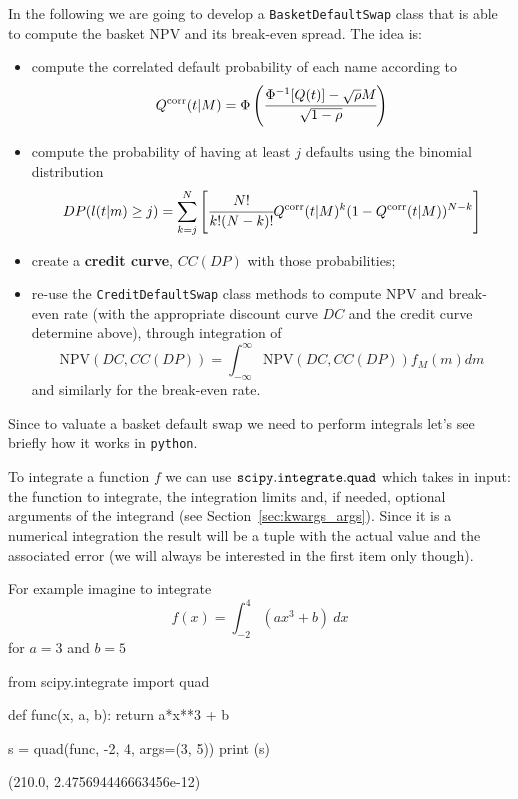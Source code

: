 In the following we are going to develop a \texttt{BasketDefaultSwap} class that is able to compute the basket NPV and its break-even spread. The idea is:
\begin{itemize}
\item compute the correlated default probability of each name according to 
\begin{equation}
Q^{\textrm{corr}}(t|M) = \Phi\left(\cfrac{\Phi^{-1}[Q(t)]-\sqrt{\rho} M}{\sqrt{1-\rho}}\right)
\end{equation}
\item compute the probability of having at least $j$ defaults using the binomial distribution
\begin{equation}
DP(l(t|m) \ge j) = \sum_{k=j}^{N}\left[  \cfrac{N!}{k!(N-k)!}Q^{\textrm{corr}}(t|M)^k(1-Q^{\textrm{corr}}(t|M))^{N-k}\right]
\end{equation}
\item create a \textbf{credit curve}, $CC(DP)$ with those probabilities;
\item re-use the \texttt{CreditDefaultSwap} class methods to compute NPV and break-even rate (with the appropriate discount curve $DC$ and the credit curve determine above), through integration of
\begin{equation}
\mathrm{NPV}(DC, CC(DP)) = \int_{-\infty}^{\infty}{\mathrm{NPV}(DC, CC(DP)) f_M(m)dm} 
\end{equation}
and similarly for the break-even rate.
\end{itemize}

Since to valuate a basket default swap we need to perform integrals let's see briefly how it works in \texttt{python}.

To integrate a function \(f\) we can use \(\tt{scipy.integrate.quad}\) which takes in input: the function to integrate, the integration limits and, if needed, optional arguments of the integrand (see Section~\ref{sec:kwargs_args}). Since it is a numerical integration the result will be a tuple with the actual value and the associated error (we will always be interested in the first item only though).

For example imagine to integrate
\[f(x) = \int_{-2}^{4}(ax^{3} + b)~dx\]
for \(a=3\) and \(b=5\)

\begin{ipython}
from scipy.integrate import quad

def func(x, a, b):
    return a*x**3 + b

s = quad(func, -2, 4, args=(3, 5))
print (s)
\end{ipython}
\begin{ioutput}
(210.0, 2.475694446663456e-12)
\end{ioutput}

